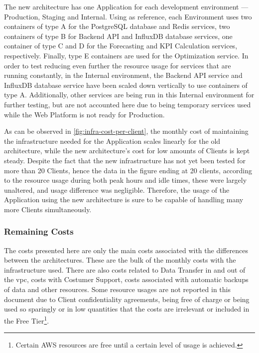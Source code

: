 The new architecture has one Application for each development environment --- Production, Staging and Internal. Using  as reference, each Environment uses two containers of type A for the PostgreSQL database and Redis services, two containers of type B for Backend API and InfluxDB database services, one container of type C and D for the Forecasting and KPI Calculation services, respectively. Finally, type E containers are used for the Optimization service. In order to test reducing even further the resource usage for services that are running constantly, in the Internal environment, the Backend API service and InfluxDB database service have been scaled down vertically to use containers of type A. Additionally, other services are being run in this Internal environment for further testing, but are not accounted here due to being temporary services used while the Web Platform is not ready for Production.



As can be observed in \cref{fig:infra-cost-per-client}, the monthly cost of maintaining the infrastructure needed for the Application scales linearly for the old architecture, while the new architecture's cost for low amounts of Clients is kept steady. Despite the fact that the new infrastructure has not yet been tested for more than 20 Clients, hence the data in the figure ending at 20 clients, according to the resource usage during both peak hours and idle times, these were largely unaltered, and usage difference was negligible. Therefore, the usage of the Application using the new architecture is sure to be capable of handling many more Clients simultaneously.




\subsubsection*{Remaining Costs}\label{results-and-discussion:sss:remaining-costs} 

The costs presented here are only the main costs associated with the differences between the architectures. These are the bulk of the monthly costs with the infrastructure used.
There are also costs related to Data Transfer in and out of the \gls{vpc}, costs with Costumer Support, costs associated with automatic backups of data and other resources. Some resource usages are not reported in this document due to Client confidentiality agreements, being free of charge or being used so sparingly or in low quantities that the costs are irrelevant or included in the Free Tier\footnote{Certain AWS resources are free until a certain level of usage is achieved.}.

